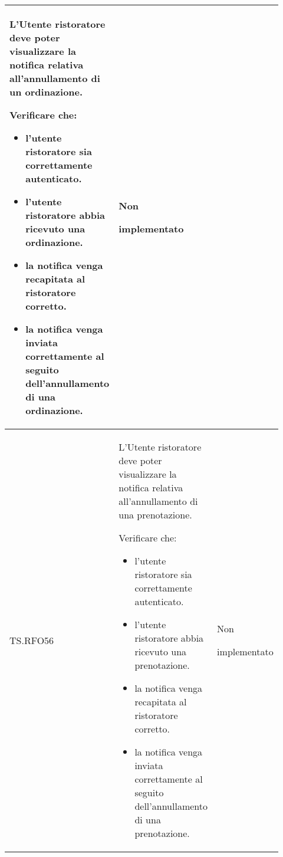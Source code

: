 \begin{longtable}{|p{0.10\linewidth}|p{0.70\linewidth}|p{0.12\linewidth}|}
	L’Utente ristoratore deve poter visualizzare la notifica relativa all’annullamento di un ordinazione. \par
	Verificare che:
	\begin{itemize}
		\item l'utente ristoratore sia correttamente autenticato.
		\item l'utente ristoratore abbia ricevuto una ordinazione.
		\item la notifica venga recapitata al ristoratore corretto.
		\item la notifica venga inviata correttamente al seguito dell'annullamento di una ordinazione.
	\end{itemize}                                 &
	Non \par implementato                                                                                                                                                   \\
	\hline
	TS.RFO56                                                                                                                        &
	L’Utente ristoratore deve poter visualizzare la notifica relativa all’annullamento di una prenotazione. \par
	Verificare che:
	\begin{itemize}
		\item l'utente ristoratore sia correttamente autenticato.
		\item l'utente ristoratore abbia ricevuto una prenotazione.
		\item la notifica venga recapitata al ristoratore corretto.
		\item la notifica venga inviata correttamente al seguito dell'annullamento di una prenotazione.
	\end{itemize}                                &
	Non \par implementato                                                                                                                                                   \\
	\hline
\end{longtable}


